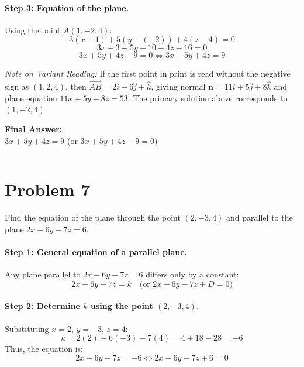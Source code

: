 \documentclass[11pt,a4paper]{article}
\begin{document}
\paragraph{Step 3: Equation of the plane.}
Using the point $A(1, -2, 4)$:
$$3(x - 1) + 5(y - (-2)) + 4(z - 4) = 0$$
$$3x - 3 + 5y + 10 + 4z - 16 = 0$$
$$3x + 5y + 4z - 9 = 0 \iff 3x + 5y + 4z = 9$$

\textit{Note on Variant Reading:} If the first point in print is read without the negative sign as $(1, 2, 4)$, then $\vec{AB} = 2\hat{i} - 6\hat{j} + \hat{k}$, giving normal $\mathbf{n} = 11\hat{i} + 5\hat{j} + 8\hat{k}$ and plane equation $11x + 5y + 8z = 53$. The primary solution above corresponds to $(1, -2, 4)$.

\begin{resultbox}
\textbf{Final Answer:}\\
$\boxed{3x + 5y + 4z = 9}$ \quad (or $3x + 5y + 4z - 9 = 0$)
\end{resultbox}

\vspace{0.4cm}
\hrule
\vspace{0.4cm}

\section{Problem 7}
\begin{problembox}[Problem 7]
Find the equation of the plane through the point $(2, -3, 4)$ and parallel to the plane $2x - 6y - 7z = 6$.
\end{problembox}

\paragraph{Step 1: General equation of a parallel plane.}
Any plane parallel to $2x - 6y - 7z = 6$ differs only by a constant:
$$2x - 6y - 7z = k \quad \text{(or } 2x - 6y - 7z + D = 0\text{)}$$

\paragraph{Step 2: Determine $k$ using the point $(2, -3, 4)$.}
Substituting $x = 2$, $y = -3$, $z = 4$:
$$k = 2(2) - 6(-3) - 7(4) = 4 + 18 - 28 = -6$$
Thus, the equation is:
$$2x - 6y - 7z = -6 \iff 2x - 6y - 7z + 6 = 0$$
\end{document}
